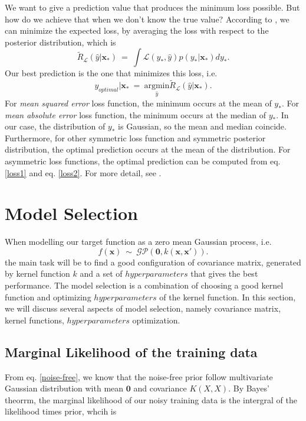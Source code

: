 \documentclass[11pt,a4paper]{article}
\theoremstyle{definition}
\newcommand{\GP}{\mathcal{GP}}
\numberwithin{equation}{section}
\let\vec\mathbf
\begin{document}
	We want to give a prediction value that produces the minimum loss possible. But how do we achieve that when we don't know the true value? According to \cite[Rasmussen and Williams, sec 2.4]{RandW}, we can minimize the expected loss, by averaging the loss with respect to the posterior distribution, which is 
	\begin{equation}\label{loss1}
	\tilde{R}_{\mathcal{L}}(\hat y|\vec x_*)\ = \ \int\mathcal{L}(y_*,\hat y)p(y_*|\vec x_*)dy_*.
	\end{equation}\label{loss2}
	Our best prediction is the one that minimizes this loss, i.e.
	\begin{equation}
	y_{optimal}|\vec x_*\ = \ \underset{\hat y}{\mathrm{argmin}}\tilde{R}_{\mathcal{L}}(\hat y|\vec x_*).
	\end{equation}
	For \textit{mean squared error} loss function, the minimum occurs at the mean of $y_*$. For \textit{mean absolute error} loss function, the minimum occurs at the median of $y_*$. In our case, the distribution of $y_*$ is Gaussian, so the mean and median coincide. Furthermore, for other symmetric loss function and symmetric posterior distribution, the optimal prediction occurs at the mean of the distribution. For asymmetric loss functions, the optimal prediction can be computed from eq. \ref{loss1} and eq. \ref{loss2}. For more detail, see \cite[Berger]{Berger}.
	
	\newpage
	\section{Model Selection}\label{sec:model_selection}
	When modelling our target function as a zero mean Gaussian process, i.e.
	\begin{equation*} \label{}
	f(\vec x) \  \sim \ \GP\left(\vec 0,k(\vec{x},\vec{x'})  \right).
	\end{equation*}
	the main task will be to find a good configuration of covariance matrix, generated by kernel function $k$ and a set of $hyperparameters$ that gives the best performance. The model selection is a combination of choosing a good kernel function and optimizing $hyperparameters$ of the kernel function. In this section, we will discuss several aspects of model selection, namely covariance matrix, kernel functions, $hyperparameters$ optimization.
	
	\subsection{Marginal Likelihood of the training data}\label{lik}
	From eq. \ref{noise-free}, we know that the noise-free prior follow multivariate Gaussian distribution with mean $\vec 0$ and covariance $K(X,X)$. By Bayes' theorrm, the marginal likelihood of our noisy training data is the intergral of the likelihood times prior, whcih is 
	
\end{document}
